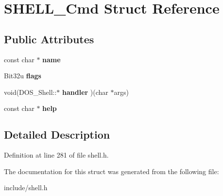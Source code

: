 \hypertarget{structSHELL__Cmd}{\section{S\-H\-E\-L\-L\-\_\-\-Cmd Struct Reference}
\label{structSHELL__Cmd}
}
\subsection*{Public Attributes}
\begin{DoxyCompactItemize}
\item 
\hypertarget{structSHELL__Cmd_a6c2bf878ebb62d9d05eed4e6228ff04b}{const char $\ast$ {\bfseries name}}\label{structSHELL__Cmd_a6c2bf878ebb62d9d05eed4e6228ff04b}

\item 
\hypertarget{structSHELL__Cmd_ae3518365a82721ce9f0b88ba409a36aa}{Bit32u {\bfseries flags}}\label{structSHELL__Cmd_ae3518365a82721ce9f0b88ba409a36aa}

\item 
\hypertarget{structSHELL__Cmd_a8ab69bb42cfd5dd8ca2cf15ce980ebf4}{void(D\-O\-S\-\_\-\-Shell\-::$\ast$ {\bfseries handler} )(char $\ast$args)}\label{structSHELL__Cmd_a8ab69bb42cfd5dd8ca2cf15ce980ebf4}

\item 
\hypertarget{structSHELL__Cmd_a3712fa3ab7cdfbbb384eee27e23b07f2}{const char $\ast$ {\bfseries help}}\label{structSHELL__Cmd_a3712fa3ab7cdfbbb384eee27e23b07f2}

\end{DoxyCompactItemize}


\subsection{Detailed Description}


Definition at line 281 of file shell.\-h.



The documentation for this struct was generated from the following file\-:\begin{DoxyCompactItemize}
\item 
include/shell.\-h\end{DoxyCompactItemize}
